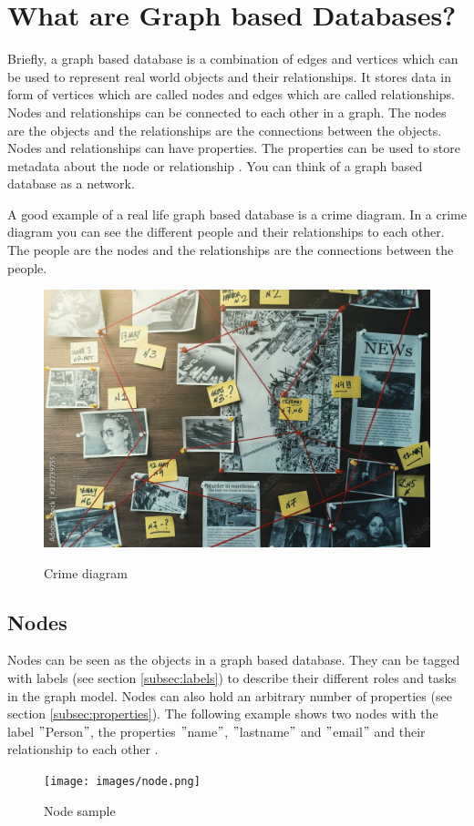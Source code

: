
\section{What are Graph based Databases?}
Briefly, a graph based database is a combination of edges and vertices which  can be used to represent real world
objects and their relationships.
It stores data in form of vertices which are called nodes and edges which are called relationships.
Nodes and relationships can be connected to each other in a graph.
The nodes are the objects and the relationships are the connections between the objects.
Nodes and relationships can have properties.
The properties can be used to store metadata about the node or relationship \parencite[P. 6f.]{PractivalNeo4j}.
You can think of a graph based database as a network.

A good example of a real life graph based database is a crime diagram.
In a crime diagram you can see the different people and their relationships to each other.
The people are the nodes and the relationships are the connections between the people. \parencite[compare P. 6f.]{BeginningNeo4j}
\begin{figure}[h]
    \centering
    \includegraphics[width=1\textwidth]{images/crimediagramm.png}
    \caption{Crime diagram} \parencite{Neo4j:crimdiagram}
    \label{fig:crimeDiagram}
\end{figure}
\subsection{Nodes}
Nodes can be seen as the objects in a graph based database.
They can be tagged with labels (see section \ref{subsec:labels}) to describe their different roles and tasks in the graph model.
Nodes can also hold an arbitrary number of properties (see section \ref{subsec:properties}).
The following example shows two nodes with the label \("\)Person\("\), the properties \("\)name\("\), \("\)lastname\("\)
and \("\)email\("\) and their relationship to each other \parencite[compare P. 6f.]{PractivalNeo4j}.
\begin{figure}[!h]
    \centering
    \texttt{[image: images/node.png]}
    \caption{Node sample} \label{img:cypher}
\end{figure}
